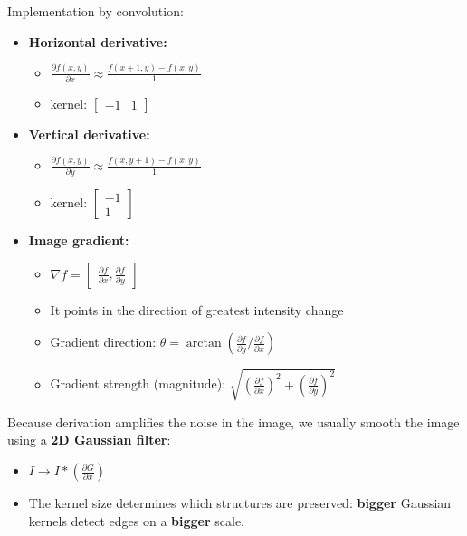 \documentclass{article}
\begin{document}
    Implementation by convolution:
    \begin{itemize}
        \item \textbf{Horizontal derivative:} 
        \begin{itemize}
            \item $ \frac{\partial{f}(x, y)}{\partial{x}} \approx \frac{f(x+1, y) - f(x, y)}{1}$
            \item kernel:
            $\begin{bmatrix}
                -1 & 1
            \end{bmatrix}$
        \end{itemize}

        \item \textbf{Vertical derivative:} 
        \begin{itemize}
            \item $ \frac{\partial{f}(x, y)}{\partial{y}} \approx \frac{f(x, y+1) - f(x, y)}{1}$
            \item kernel:
            $\begin{bmatrix}
                -1 \\
                 1
            \end{bmatrix}$
        \end{itemize}

        \item \textbf{Image gradient:}
        \begin{itemize}
            \item $\nabla{f} = 
            \begin{bmatrix}
                \frac{\partial{f}}{\partial{x}}, \frac{\partial{f}}{\partial{y}}
            \end{bmatrix}$
            \item It points in the direction of greatest intensity change
            \item Gradient direction: $\theta = \arctan{(\frac{\partial{f}}{\partial{y}} / \frac{\partial{f}}{\partial{x}})}$
            \item Gradient strength (magnitude): $\sqrt{(\frac{\partial{f}}{\partial{x}})^2 + (\frac{\partial{f}}{\partial{y}})^2}$
        \end{itemize}
    \end{itemize}

    Because derivation amplifies the noise in the image, we usually smooth the image using a \textbf{2D Gaussian filter}:
    \begin{itemize}
        \item $I \rightarrow I * (\frac{\partial{G}}{\partial{x}})$
        \item The kernel size determines which structures are preserved: \textbf{bigger} Gaussian kernels detect edges on a \textbf{bigger} scale.
    \end{itemize}
\end{document}

